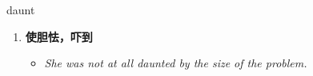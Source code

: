 
\begin{frame}
{\huge daunt}
\begin{center}
\begin{enumerate}\Large
  \item \textbf{使胆怯，吓到}
  \begin{itemize}
    \item \em{\Large{She was not at all daunted by the size of the problem.}}
  \end{itemize}
\end{enumerate}
\end{center}
\end{frame}
